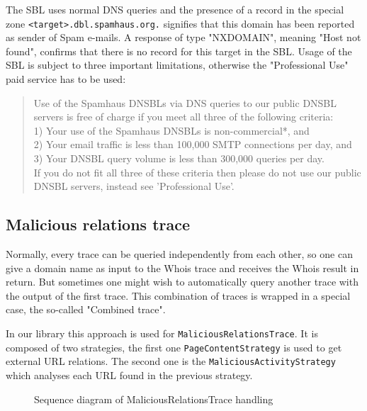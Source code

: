 \documentclass[
	a4paper,					10pt,							twoside,					openright,				notitlepage,			parskip=half,			]{scrreprt}
\begin{document}
The \gls{SBL} uses normal \gls{DNS} queries and the presence of a record in the special zone \verb|<target>.dbl.spamhaus.org.|
signifies that this domain has been reported as sender of Spam e-mails. A response of type "NXDOMAIN", meaning "Host not found",
confirms that there is no record for this target in the \gls{SBL}.
Usage of the \gls{SBL} is subject to three important limitations, otherwise the "Professional Use" paid service has to be used\cite{license:spamhaus}:
\begin{quotation}
Use of the Spamhaus DNSBLs via \gls{DNS} queries to our public \gls{DNSBL} servers is free of charge if you meet all three of the following criteria:\\
1) Your use of the Spamhaus \gls{DNSBL}s is non-commercial*,
    and\\
2) Your email traffic is less than 100,000 SMTP connections
    per day, and\\
3) Your \gls{DNSBL} query volume is less than 300,000 queries
    per day.\\
If you do not fit all three of these criteria then please do not use our public \gls{DNSBL} servers, instead see 'Professional Use'.
\end{quotation}

\subsection{Malicious relations trace}
\label{subsec:api_libstruct_combined}

Normally, every trace can be queried independently from each other, so one can give a domain name as input 
to the Whois trace and receives the Whois result in return. But sometimes one might wish to automatically 
query another trace with the output of the first trace. This combination of traces is wrapped in a
special case, the so-called "Combined trace".

In our library this approach is used for \verb|MaliciousRelationsTrace|.
It is composed of two strategies, the first one \verb|PageContentStrategy| is used to get external \gls{URL} relations.
The second one is the \verb|MaliciousActivityStrategy| which analyses each \gls{URL} found in the previous strategy. 

\begin{figure}[H] 
\caption{Sequence diagram of MaliciousRelationsTrace handling}
\label{fig:seq-maliciousrelationstrace}
\end{figure}
\end{document}
